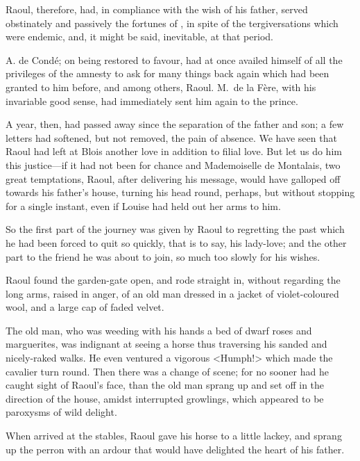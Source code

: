 Raoul, therefore, had, in compliance with the wish of his father, served obstinately and passively the fortunes of , in spite of the tergiversations which were endemic, and, it might be said, inevitable, at that period.

A. de Condé; on being restored to favour, had at once availed himself of all the privileges of the amnesty to ask for many things back again which had been granted to him before, and among others, Raoul. M.~de la Fère, with his invariable good sense, had immediately sent him again to the prince.

A year, then, had passed away since the separation of the father and son; a few letters had softened, but not removed, the pain of absence. We have seen that Raoul had left at Blois another love in addition to filial love. But let us do him this justice—if it had not been for chance and Mademoiselle de Montalais, two great temptations, Raoul, after delivering his message, would have galloped off towards his father's house, turning his head round, perhaps, but without stopping for a single instant, even if Louise had held out her arms to him.

So the first part of the journey was given by Raoul to regretting the past which he had been forced to quit so quickly, that is to say, his lady-love; and the other part to the friend he was about to join, so much too slowly for his wishes.

Raoul found the garden-gate open, and rode straight in, without regarding the long arms, raised in anger, of an old man dressed in a jacket of violet-coloured wool, and a large cap of faded velvet.

The old man, who was weeding with his hands a bed of dwarf roses and marguerites, was indignant at seeing a horse thus traversing his sanded and nicely-raked walks. He even ventured a vigorous <Humph!> which made the cavalier turn round. Then there was a change of scene; for no sooner had he caught sight of Raoul's face, than the old man sprang up and set off in the direction of the house, amidst interrupted growlings, which appeared to be paroxysms of wild delight.

When arrived at the stables, Raoul gave his horse to a little lackey, and sprang up the perron with an ardour that would have delighted the heart of his father.

